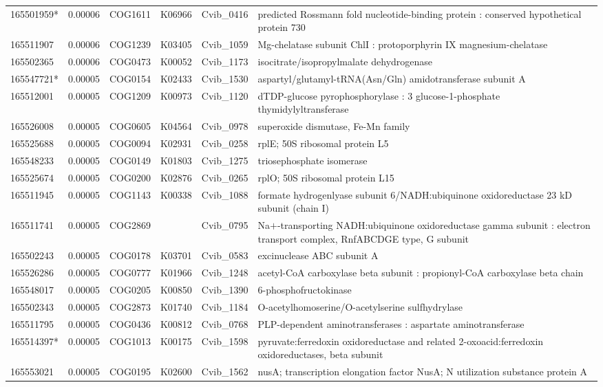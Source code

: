 \begin{landscape}
\begin{longtable}{p{1.8cm}p{0.9cm}p{2.2cm}p{1cm}p{2.8cm}p{13.4cm}}
165501959*&0.00006&COG1611&K06966&Cvib\_0416&predicted Rossmann fold nucleotide-binding protein : conserved hypothetical protein 730 \\
165511907&0.00006&COG1239&K03405&Cvib\_1059&Mg-chelatase subunit ChlI : protoporphyrin IX magnesium-chelatase \\
165502365&0.00006&COG0473&K00052&Cvib\_1173&isocitrate/isopropylmalate dehydrogenase \\
165547721*&0.00005&COG0154&K02433&Cvib\_1530&aspartyl/glutamyl-tRNA(Asn/Gln) amidotransferase subunit A \\
165512001&0.00005&COG1209&K00973&Cvib\_1120&dTDP-glucose pyrophosphorylase : 3 glucose-1-phosphate thymidylyltransferase \\
165526008&0.00005&COG0605&K04564&Cvib\_0978&superoxide dismutase, Fe-Mn family \\
165525688&0.00005&COG0094&K02931&Cvib\_0258&rplE; 50S ribosomal protein L5 \\
165548233&0.00005&COG0149&K01803&Cvib\_1275&triosephosphate isomerase \\
165525674&0.00005&COG0200&K02876&Cvib\_0265&rplO; 50S ribosomal protein L15 \\
165511945&0.00005&COG1143&K00338&Cvib\_1088&formate hydrogenlyase subunit 6/NADH:ubiquinone oxidoreductase 23 kD subunit (chain I) \\
165511741&0.00005&COG2869&&Cvib\_0795&Na$+$-transporting NADH:ubiquinone oxidoreductase gamma subunit : electron transport complex, RnfABCDGE type, G subunit \\
165502243&0.00005&COG0178&K03701&Cvib\_0583&excinuclease ABC subunit A \\
165526286&0.00005&COG0777&K01966&Cvib\_1248&acetyl-CoA carboxylase beta subunit : propionyl-CoA carboxylase beta chain \\
165548017&0.00005&COG0205&K00850&Cvib\_1390&6-phosphofructokinase \\
165502343&0.00005&COG2873&K01740&Cvib\_1184&O-acetylhomoserine/O-acetylserine sulfhydrylase \\
165511795&0.00005&COG0436&K00812&Cvib\_0768&PLP-dependent aminotransferases : aspartate aminotransferase \\
165514397*&0.00005&COG1013&K00175&Cvib\_1598&pyruvate:ferredoxin oxidoreductase and related 2-oxoacid:ferredoxin oxidoreductases, beta subunit \\
165553021&0.00005&COG0195&K02600&Cvib\_1562&nusA; transcription elongation factor NusA; N utilization substance protein A \\

\end{longtable}
\end{landscape}
